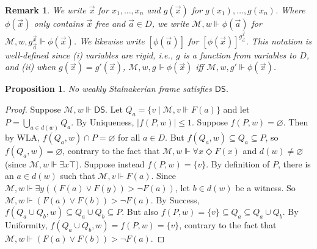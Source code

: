 \documentclass[12pt]{article}
\newtheorem{proposition}{Proposition}
\newtheorem{remark}{Remark}
\newcommand{\would}{\mathbin{>}}
\newcommand{\pos}{\mathop{\Diamond}}
\begin{document}
\begin{remark}
We write $\vec{x}$ for $x_1,\dots,x_n$ and $g(\vec{x})$ for $g(x_1),\dots,g(x_n)$. 
Where $\phi(\vec{x})$ only contains $\vec{x}$ free and $\vec{a} \in D$, we write $\mathcal{M},w \Vdash \phi(\vec{a})$ for $\mathcal{M},w,g^{\vec{x}}_{\vec{a}} \Vdash \phi(\vec{x})$. 
We likewise write $[\phi(\vec{a})]$ for $[\phi(\vec{x})]^{g^{\vec{x}}_{\vec{a}}}$. 
This notation is well-defined since (i) variables are rigid, i.e., $g$ is a function from variables to $D$, and (ii) when $g(\vec{x}) = g'(\vec{x})$, $\mathcal{M},w,g \Vdash \phi(\vec{x})$ iff $\mathcal{M},w,g' \Vdash \phi(\vec{x})$.  
\end{remark}

\begin{proposition}
\label{prop:DS}
    No weakly Stalnakerian frame satisfies $\mathsf{DS}$.
\end{proposition}
\begin{proof}
    Suppose $\mathcal{M},w \Vdash \mathsf{DS}$. 
    Let $Q_a = \{v \mid \mathcal{M},v \Vdash F(a)\}$ and let $P = \bigcup_{a \in d(w)} Q_a$. 
    By Uniqueness, $|f(P,w)| \leq 1$. 
    Suppose $f(P,w) = \varnothing$. 
    Then by WLA, $f(Q_a,w) \cap P = \varnothing$ for all $a \in D$. 
    But $f(Q_a,w) \subseteq Q_a \subseteq P$, so $f(Q_a,w) = \varnothing$, contrary to the fact that $\mathcal{M},w \Vdash \forall x \pos F(x)$ and $d(w) \neq \varnothing$ (since $\mathcal{M},w \Vdash \exists x \top$). 
    Suppose instead $f(P,w) = \{v\}$. 
    By definition of $P$, there is an $a \in d(w)$ such that $\mathcal{M},v \Vdash F(a)$. 
    Since $\mathcal{M},w \Vdash \exists y((F(a) \vee F(y)) \would \neg F(a))$, let $b \in d(w)$ be a witness. 
    So $\mathcal{M},w \Vdash (F(a) \vee F(b)) \would \neg F(a)$.
    By Success, $f(Q_a \cup Q_b,w) \subseteq Q_a \cup Q_b \subseteq P$. 
    But also $f(P,w) = \{v\} \subseteq Q_a \subseteq Q_a \cup Q_b$. 
    By Uniformity, $f(Q_a \cup Q_b,w) = f(P,w) = \{v\}$, contrary to the fact that $\mathcal{M},w \Vdash (F(a) \vee F(b)) \would \neg F(a)$. %
\end{proof}
\end{document}
